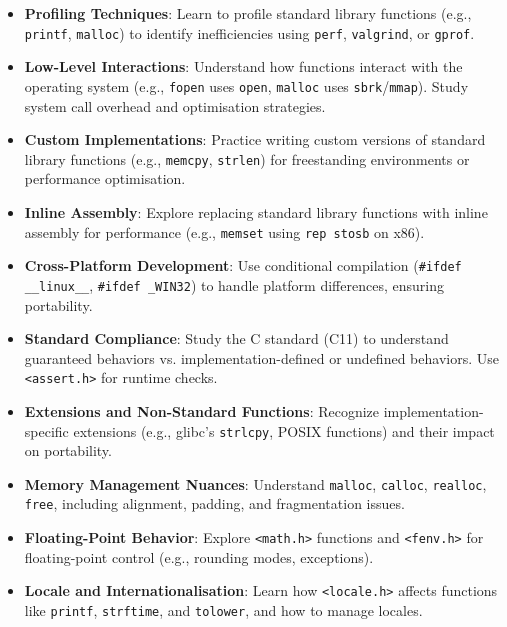 \documentclass[a4paper,12pt]{article}
\begin{document}
\begin{itemize}[noitemsep]
    \item \textbf{Profiling Techniques}: Learn to profile standard library functions (e.g., \texttt{printf}, \texttt{malloc}) to identify inefficiencies using \texttt{perf}, \texttt{valgrind}, or \texttt{gprof}.

    \item \textbf{Low-Level Interactions}: Understand how functions interact with the operating system (e.g., \texttt{fopen} uses \texttt{open}, \texttt{malloc} uses \texttt{sbrk}/\texttt{mmap}). Study system call overhead and optimisation strategies.

    \item \textbf{Custom Implementations}: Practice writing custom versions of standard library functions (e.g., \texttt{memcpy}, \texttt{strlen}) for freestanding environments or performance optimisation.

    \item \textbf{Inline Assembly}: Explore replacing standard library functions with inline assembly for performance (e.g., \texttt{memset} using \texttt{rep stosb} on x86).

    \item \textbf{Cross-Platform Development}: Use conditional compilation (\texttt{\#ifdef \_\_linux\_\_}, \texttt{\#ifdef \_WIN32}) to handle platform differences, ensuring portability.

    \item \textbf{Standard Compliance}: Study the C standard (C11) to understand guaranteed behaviors vs. implementation-defined or undefined behaviors. Use \texttt{<assert.h>} for runtime checks.

    \item \textbf{Extensions and Non-Standard Functions}: Recognize implementation-specific extensions (e.g., glibc’s \texttt{strlcpy}, POSIX functions) and their impact on portability.

    \item \textbf{Memory Management Nuances}: Understand \texttt{malloc}, \texttt{calloc}, \texttt{realloc}, \texttt{free}, including alignment, padding, and fragmentation issues.

    \item \textbf{Floating-Point Behavior}: Explore \texttt{<math.h>} functions and \texttt{<fenv.h>} for floating-point control (e.g., rounding modes, exceptions).

    \item \textbf{Locale and Internationalisation}: Learn how \texttt{<locale.h>} affects functions like \texttt{printf}, \texttt{strftime}, and \texttt{tolower}, and how to manage locales.


\end{itemize}
\end{document}
